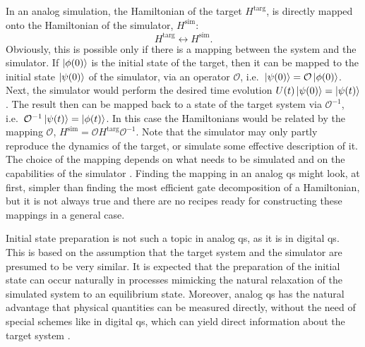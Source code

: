 In an analog simulation, the Hamiltonian of the target $H^{\text{targ}}$, is directly mapped onto the Hamiltonian of the simulator, $H^{\text{sim}}$:
\begin{equation*}
    H^{\text{targ}} \longleftrightarrow H^{\text{sim}}.
\end{equation*}
Obviously, this is possible only if there is a mapping between the system and the simulator.
If $\ket{\phi(0)}$ is the initial state of the target, then it can be mapped to the initial state $\ket{\psi(0)}$ of the simulator, via an operator $\mathcal{O}$, i.e.~$\ket{\psi(0)} = \mathcal{O} \ket{\phi(0)}$.
Next, the simulator would perform the desired time evolution $U(t) \ket{\psi(0)} = \ket{\psi(t)}$.
The result then can be mapped back to a state of the target system via $\mathcal{O}^{-1}$, i.e.~$\mathcal{O}^{-1}\ket{\psi(t)} = \ket{\phi(t)}$.
In this case the Hamiltonians would be related by the mapping $\mathcal{O}$, $H^{\text{sim}} = \mathcal{O} H^{\text{targ}} \mathcal{O}^{-1}$.
Note that the simulator may only partly reproduce the dynamics of the target, or simulate some effective description of it.
The choice of the mapping depends on what needs to be simulated and on the capabilities of the simulator \cite{georgescu2014simulation}.
Finding the mapping in an analog \ac{qs} might look, at first, simpler than finding the most efficient gate decomposition of a Hamiltonian, but it is not always true and there are no recipes ready for constructing these mappings in a general case.

Initial state preparation is not such a topic in analog \ac{qs}, as it is in digital \ac{qs}.
This is based on the assumption that the target system and the simulator are presumed to be very similar.
It is expected that the preparation of the initial state can occur naturally in processes mimicking the natural relaxation of the simulated system to an equilibrium state.
Moreover, analog \ac{qs} has the natural advantage that physical quantities can be measured directly, without the need of special schemes like in digital \ac{qs}, which can yield direct information about the target system \cite{hauke2012simulators}.

